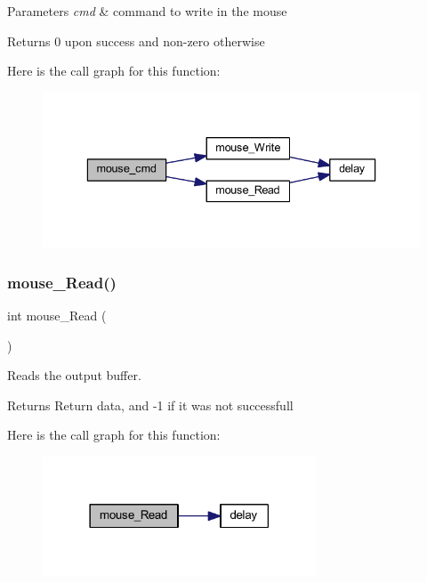 \begin{DoxyParams}{Parameters}
{\em cmd} & command to write in the mouse \\
\hline
\end{DoxyParams}
\begin{DoxyReturn}{Returns}
0 upon success and non-\/zero otherwise 
\end{DoxyReturn}
Here is the call graph for this function\+:
\nopagebreak
\begin{figure}[H]
\begin{center}
\leavevmode
\includegraphics[width=336pt]{group___mouse_gad7c890a972e1f92e3a494d356795a103_cgraph}
\end{center}
\end{figure}
\mbox{\label{group___mouse_gaad10b68ed5addb9bd150288dd869d586}} 
\subsubsection{\texorpdfstring{mouse\+\_\+\+Read()}{mouse\_Read()}}
{\footnotesize\ttfamily int mouse\+\_\+\+Read (\begin{DoxyParamCaption}{ }\end{DoxyParamCaption})}



Reads the output buffer. 

\begin{DoxyReturn}{Returns}
Return data, and -\/1 if it was not successfull 
\end{DoxyReturn}
Here is the call graph for this function\+:
\nopagebreak
\begin{figure}[H]
\begin{center}
\leavevmode
\includegraphics[width=230pt]{group___mouse_gaad10b68ed5addb9bd150288dd869d586_cgraph}
\end{center}
\end{figure}
\mbox{\label{group___mouse_ga99506573209b197b84ee22a228b89fbd}} 
